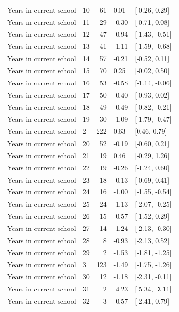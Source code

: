 \begin{tabular}{llrll}
Years in current school & 10 & 61 & 0.01 & {}[-0.26, 0.29]\\
\addlinespace
Years in current school & 11 & 29 & -0.30 & {}[-0.71, 0.08]\\
Years in current school & 12 & 47 & -0.94 & {}[-1.43, -0.51]\\
Years in current school & 13 & 41 & -1.11 & {}[-1.59, -0.68]\\
Years in current school & 14 & 57 & -0.21 & {}[-0.52, 0.11]\\
Years in current school & 15 & 70 & 0.25 & {}[-0.02, 0.50]\\
\addlinespace
Years in current school & 16 & 53 & -0.58 & {}[-1.14, -0.06]\\
Years in current school & 17 & 50 & -0.40 & {}[-0.93, 0.02]\\
Years in current school & 18 & 49 & -0.49 & {}[-0.82, -0.21]\\
Years in current school & 19 & 30 & -1.09 & {}[-1.79, -0.47]\\
Years in current school & 2 & 222 & 0.63 & {}[0.46, 0.79]\\
\addlinespace
Years in current school & 20 & 52 & -0.19 & {}[-0.60, 0.21]\\
Years in current school & 21 & 19 & 0.46 & {}[-0.29, 1.26]\\
Years in current school & 22 & 19 & -0.26 & {}[-1.24, 0.60]\\
Years in current school & 23 & 18 & -0.13 & {}[-0.69, 0.41]\\
Years in current school & 24 & 16 & -1.00 & {}[-1.55, -0.54]\\
\addlinespace
Years in current school & 25 & 24 & -1.13 & {}[-2.07, -0.25]\\
Years in current school & 26 & 15 & -0.57 & {}[-1.52, 0.29]\\
Years in current school & 27 & 14 & -1.24 & {}[-2.13, -0.30]\\
Years in current school & 28 & 8 & -0.93 & {}[-2.13, 0.52]\\
Years in current school & 29 & 2 & -1.53 & {}[-1.81, -1.25]\\
\addlinespace
Years in current school & 3 & 123 & -1.49 & {}[-1.75, -1.26]\\
Years in current school & 30 & 12 & -1.18 & {}[-2.31, -0.11]\\
Years in current school & 31 & 2 & -4.23 & {}[-5.34, -3.11]\\
Years in current school & 32 & 3 & -0.57 & {}[-2.41, 0.79]\\

\end{tabular}
